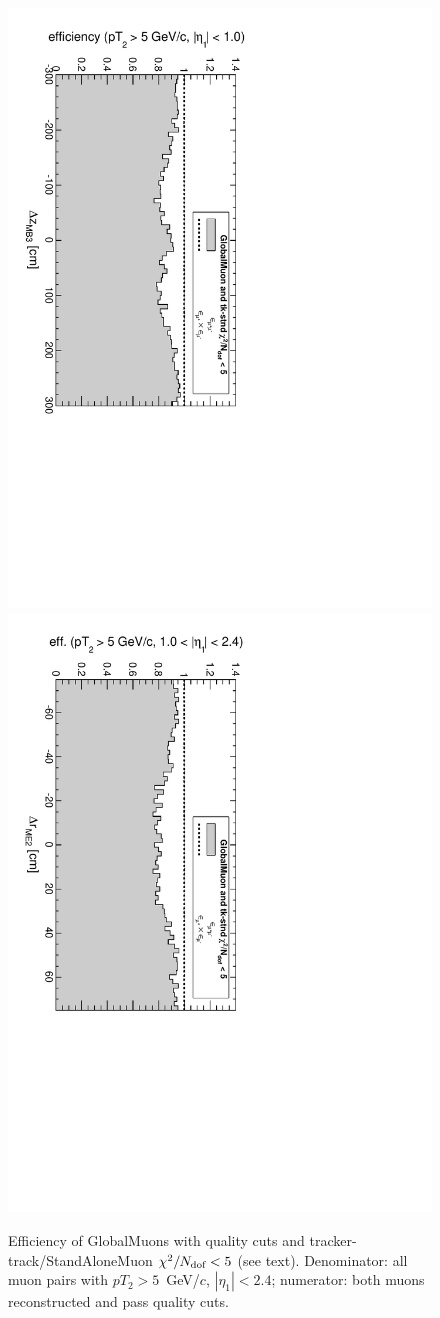 \documentclass[12pt]{article}
\newcommand{\s}[1]{{\mbox{\scriptsize #1}}}
\begin{document}
\begin{figure}
\includegraphics[height=0.5\linewidth, angle=90]{fig/acceptance8_plot/vsmb3dz_GlobalMuonMaxChi5.pdf}
\includegraphics[height=0.5\linewidth, angle=90]{fig/acceptance8_plot/vsme2dr_GlobalMuonMaxChi5.pdf}

\caption{Efficiency of GlobalMuons with quality cuts and tracker-track/StandAloneMuon $\chi^2/N_\s{dof} < 5$ (see text).  Denominator: all muon pairs with $pT_2 > 5$~GeV/$c$, $|\eta_1| < 2.4$; numerator: both muons reconstructed and pass quality cuts. \label{fig:efficiencies_GlobalMuonMaxChi5}}
\end{figure}
\end{document}
